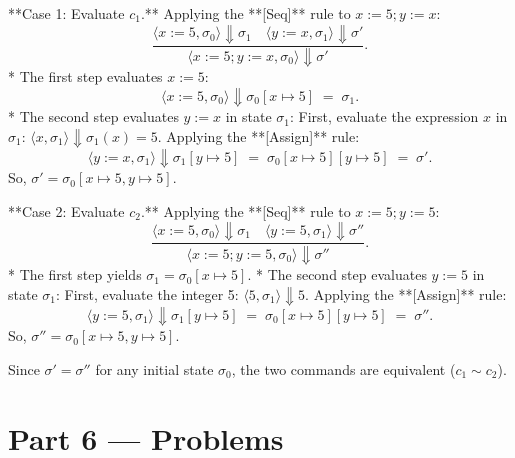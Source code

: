 \documentclass[12pt, a4paper]{book}
\begin{document}
\begin{problembox}
\begin{enumerate}[label=\textbf{E\arabic*.}]
        **Case 1: Evaluate $c_1$.**
        Applying the **[Seq]** rule to $x := 5 ; y := x$:
        \[
          \frac{\langle x := 5, \sigma_0 \rangle \Downarrow \sigma_1 \quad \langle y := x, \sigma_1 \rangle \Downarrow \sigma'}{\langle x := 5 ; y := x, \sigma_0 \rangle \Downarrow \sigma'}.
        \]
        * The first step evaluates $x := 5$:
          \[
            \langle x := 5, \sigma_0 \rangle \Downarrow \sigma_0[x \mapsto 5] \;=\; \sigma_1.
          \]
        * The second step evaluates $y := x$ in state $\sigma_1$:
          First, evaluate the expression $x$ in $\sigma_1$: $\langle x, \sigma_1 \rangle \Downarrow \sigma_1(x) = 5$.
          Applying the **[Assign]** rule:
          \[
            \langle y := x, \sigma_1 \rangle \Downarrow \sigma_1[y \mapsto 5] \;=\; \sigma_0[x \mapsto 5][y \mapsto 5] \;=\; \sigma'.
          \]
        So, $\sigma' = \sigma_0[x \mapsto 5, y \mapsto 5]$.
        
        **Case 2: Evaluate $c_2$.**
        Applying the **[Seq]** rule to $x := 5 ; y := 5$:
        \[
          \frac{\langle x := 5, \sigma_0 \rangle \Downarrow \sigma_1 \quad \langle y := 5, \sigma_1 \rangle \Downarrow \sigma''}{\langle x := 5 ; y := 5, \sigma_0 \rangle \Downarrow \sigma''}.
        \]
        * The first step yields $\sigma_1 = \sigma_0[x \mapsto 5]$.
        * The second step evaluates $y := 5$ in state $\sigma_1$:
          First, evaluate the integer 5: $\langle 5, \sigma_1 \rangle \Downarrow 5$.
          Applying the **[Assign]** rule:
          \[
            \langle y := 5, \sigma_1 \rangle \Downarrow \sigma_1[y \mapsto 5] \;=\; \sigma_0[x \mapsto 5][y \mapsto 5] \;=\; \sigma''.
          \]
        So, $\sigma'' = \sigma_0[x \mapsto 5, y \mapsto 5]$.
        
        Since $\sigma' = \sigma''$ for any initial state $\sigma_0$, the two commands are equivalent ($c_1 \sim c_2$).
\end{enumerate}
\end{problembox}

\newpage

\section{Part 6 --- Problems}
\end{document}
